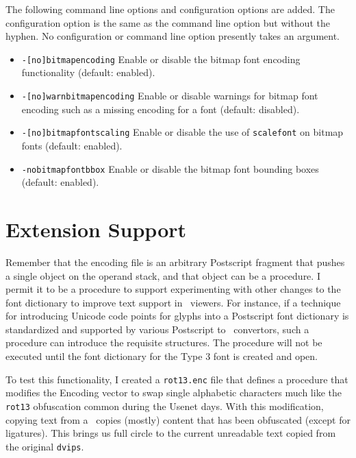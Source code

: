 \documentclass{ltugboat}
\def\PDF{\acro{PDF}}
\def\dvips{\texttt{dvips}}
\begin{document}
The following command line options and configuration options are
added.  The configuration option is the same as the command line
option but without the hyphen.  No configuration or command line
option presently takes an argument.

\begin{itemize}
\item \texttt{-[no]bitmapencoding} Enable or disable the bitmap font encoding
functionality (default: enabled).
\item \texttt{-[no]warnbitmapencoding} Enable or disable warnings for bitmap font
encoding such as a missing encoding for a font (default: disabled).
\item \texttt{-[no]bitmapfontscaling} Enable or disable the use of
\texttt{scalefont} on bitmap fonts (default: enabled).
\item \texttt{-nobitmapfontbbox} Enable or disable the  bitmap font bounding
boxes (default: enabled).
\end{itemize}

\section{Extension Support}

Remember that the encoding file is an arbitrary Postscript fragment
that pushes a single object on the operand stack, and that object
can be a procedure.  I permit it to be a procedure to support
experimenting with other changes to the font dictionary to improve
text support in \PDF\ viewers.  For instance, if a technique for
introducing Unicode code points for glyphs into a Postscript font
dictionary is standardized and supported by various Postscript
to \PDF\ convertors, such a procedure can introduce the requisite
structures.  The procedure will not be executed until the
font dictionary for the Type 3 font is created and open.

To test this functionality, I created a \texttt{rot13.enc} file
that defines a procedure that modifies the Encoding vector to swap
single alphabetic characters much like the \texttt{rot13} obfuscation
common during the Usenet days.  With this modification, copying
text from a \PDF\ copies (mostly) content that has been obfuscated
(except for ligatures).  This brings us full circle to the
current unreadable text copied from the original \dvips.




\makesignature
\end{document}
